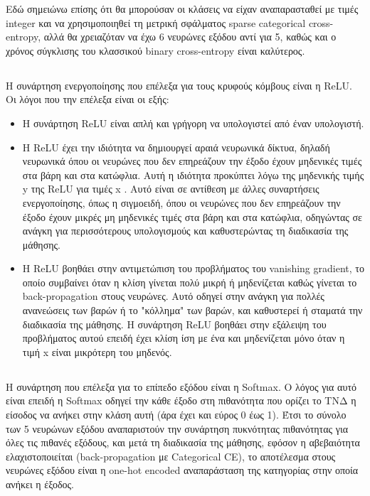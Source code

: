 \documentclass[12pt,a4paper]{article}
\begin{document}
Εδώ σημειώνω επίσης ότι θα μπορούσαν οι κλάσεις να είχαν αναπαρασταθεί με τιμές integer και να χρησιμοποιηθεί τη μετρική σφάλματος sparse categorical cross-entropy, αλλά θα χρειαζόταν να έχω 6 νευρώνες εξόδου αντί για 5, καθώς και ο χρόνος σύγκλισης του κλασσικού binary cross-entropy είναι καλύτερος.

\subsection{}
Η συνάρτηση ενεργοποίησης που επέλεξα για τους κρυφούς κόμβους είναι η ReLU. Οι λόγοι που την επέλεξα είναι οι εξής:
\begin{itemize}
    \item Η συνάρτηση ReLU είναι απλή και γρήγορη να υπολογιστεί από έναν υπολογιστή.
    \item H ReLU έχει την ιδιότητα να δημιουργεί αραιά νευρωνικά δίκτυα, δηλαδή νευρωνικά όπου οι νευρώνες που δεν επηρεάζουν την έξοδο έχουν μηδενικές τιμές στα βάρη και στα κατώφλια. Αυτή η ιδιότητα προκύπτει λόγω της μηδενικής τιμής y της ReLU για τιμές x . Αυτό είναι σε αντίθεση με άλλες συναρτήσεις ενεργοποίησης, όπως η σιγμοειδή, όπου οι νευρώνες που δεν επηρεάζουν την έξοδο έχουν μικρές μη μηδενικές τιμές στα βάρη και στα κατώφλια, οδηγώντας σε ανάγκη για περισσότερους υπολογισμούς και καθυστερώντας τη διαδικασία της μάθησης.
    \item Η ReLU βοηθάει στην αντιμετώπιση του προβλήματος του vanishing gradient, το οποίο συμβαίνει όταν η κλίση γίνεται πολύ μικρή ή μηδενίζεται καθώς γίνεται το back-propagation στους νευρώνες. Αυτό οδηγεί στην ανάγκη για πολλές ανανεώσεις των βαρών ή το "κόλλημα" των βαρών, και καθυστερεί ή σταματά την διαδικασία της μάθησης. Η συνάρτηση ReLU βοηθάει στην εξάλειψη του προβλήματος αυτού επειδή έχει κλίση ίση με ένα και μηδενίζεται μόνο όταν η τιμή x είναι μικρότερη του μηδενός.
\end{itemize}

\subsection{}
Η συνάρτηση που επέλεξα για το επίπεδο εξόδου είναι η Softmax. Ο λόγος για αυτό είναι επειδή η Softmax οδηγεί την κάθε έξοδο στη πιθανότητα που ορίζει το ΤΝΔ η είσοδος να ανήκει στην κλάση αυτή (άρα έχει και εύρος 0 έως 1). Έτσι το σύνολο των 5 νευρώνων εξόδου αναπαριστούν την συνάρτηση πυκνότητας πιθανότητας για όλες τις πιθανές εξόδους, και μετά τη διαδικασία της μάθησης, εφόσον η αβεβαιότητα ελαχιστοποιείται (back-propagation με Categorical CE), το αποτέλεσμα στους νευρώνες εξόδου είναι η one-hot encoded αναπαράσταση της κατηγορίας στην οποία ανήκει η έξοδος.
\end{document}

